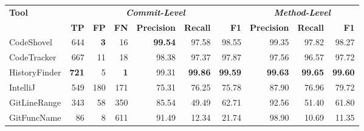 \begin{tabular}{lrrrrrrrrr}
\toprule
\multirow{2}{*}{\textbf{Tool}} &
\multicolumn{6}{c}{\textbf{\emph{Commit-Level}}} &
\multicolumn{3}{c}{\textbf{\emph{Method-Level}}} \\
\cmidrule(lr){2-7} \cmidrule(lr){8-10}
& \textbf{TP} & \textbf{FP} & \textbf{FN} &
\textbf{Precision} & \textbf{Recall} & \textbf{F1} &
\textbf{Precision} & \textbf{Recall} & \textbf{F1} \\
\midrule
CodeShovel    & 644          & \textbf{3} & 16         & \textbf{99.54} & 97.58          & 98.55          & 99.35          & 97.82          & 98.27 \\
CodeTracker   & 667          & 11         & 18         & 98.38          & 97.37          & 97.87          & 97.56          & 96.57          & 97.72 \\
HistoryFinder & \textbf{721} & 5          & \textbf{1} & 99.31          & \textbf{99.86} & \textbf{99.59} & \textbf{99.63} & \textbf{99.65} & \textbf{99.60} \\
IntelliJ      & 549          & 180        & 171        & 75.31          & 76.25          & 75.78          & 87.90          & 76.96          & 79.72 \\
GitLineRange  & 343          & 58         & 350        & 85.54          & 49.49          & 62.71          & 92.56          & 51.40          & 61.80 \\
GitFuncName   & 86           & 8          & 611        & 91.49          & 12.34          & 21.74          & 98.90          & 10.69          & 11.35 \\
\bottomrule
\end{tabular}
